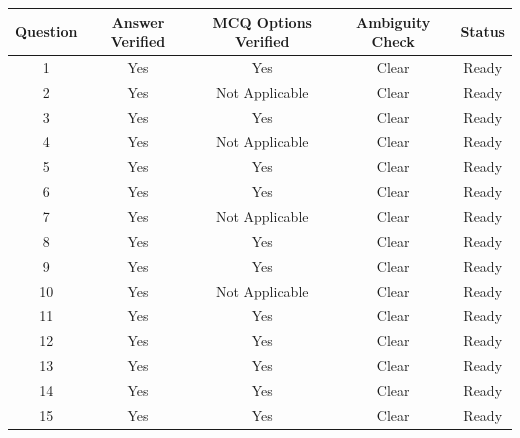 \documentclass[11pt]{article}
\begin{document}
\begin{center}
\begin{tabular}{|c|c|c|c|c|}
\hline
\textbf{Question} & \textbf{Answer Verified} & \textbf{MCQ Options Verified} & \textbf{Ambiguity Check} & \textbf{Status} \\
\hline
1  & Yes & Yes            & Clear & Ready \\ \hline
2  & Yes & Not Applicable & Clear & Ready \\ \hline
3  & Yes & Yes            & Clear & Ready \\ \hline
4  & Yes & Not Applicable & Clear & Ready \\ \hline
5  & Yes & Yes            & Clear & Ready \\ \hline
6  & Yes & Yes            & Clear & Ready \\ \hline
7  & Yes & Not Applicable & Clear & Ready \\ \hline
8  & Yes & Yes            & Clear & Ready \\ \hline
9  & Yes & Yes            & Clear & Ready \\ \hline
10 & Yes & Not Applicable & Clear & Ready \\ \hline
11 & Yes & Yes            & Clear & Ready \\ \hline
12 & Yes & Yes            & Clear & Ready \\ \hline
13 & Yes & Yes            & Clear & Ready \\ \hline
14 & Yes & Yes            & Clear & Ready \\ \hline
15 & Yes & Yes            & Clear & Ready \\ \hline
\end{tabular}
\end{center}
\end{document}
